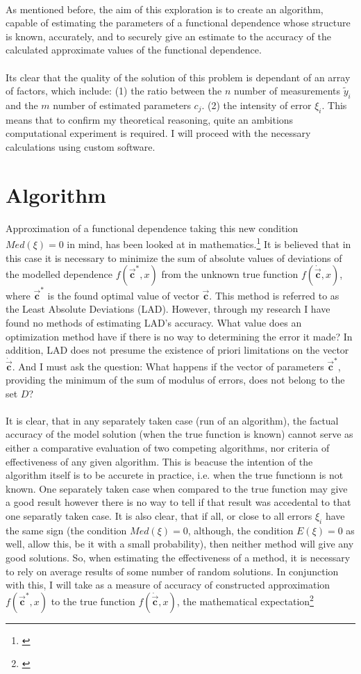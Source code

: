 \documentclass[11pt,a4paper]{article}
\numberwithin{equation}{subsection}
\newcommand{\vecc}{\vec{\textbf{c}}}
\begin{document}
\\
As mentioned before, the aim of this exploration is to create an algorithm, capable of estimating the parameters of a functional dependence whose structure is known, accurately,  and to securely give an estimate to the accuracy of the calculated approximate values of the functional dependence. \\
\\
Its clear that the quality of the solution of this problem is dependant of an array of factors, which include: (1) the ratio between the $n$ number of measurements $\tilde{y}_{i}$ and the $m$ number of estimated parameters $c_{j}$. (2) the intensity of error $\xi_{i}$. This means that to confirm my theoretical reasoning, quite an ambitions computational experiment is required. I will proceed with the necessary calculations using custom software. 

\section{Algorithm}

Approximation of a functional dependence taking this new condition $Med(\xi)=0$ in mind, has been looked at in mathematics.\footnote{\cite{balk_2010}} It is believed that in this case it is necessary to minimize the sum of absolute values of deviations of the modelled dependence $f(\vecc^{*},x)$ from the unknown true function $f(\dot{\vecc},x)$, where $\vecc^{*}$ is the found optimal value of  vector $\vecc$. This method is referred to as the Least Absolute Deviations (LAD). However, through my research I have found no methods of estimating LAD's accuracy. What value does an optimization method have if there is no way to determining the error it made? In addition, LAD does not presume the existence of priori limitations on the vector $\dot{\vecc}$. And I must ask the question: What happens if the vector of parameters $\vecc^{*}$, providing the minimum of the sum of modulus of errors, does not belong to the set $D$? \\
\\
It is clear, that in any separately taken case (run of an algorithm), the factual accuracy of the model solution (when the true function is known) cannot serve as either a comparative evaluation of two competing algorithms, nor criteria of effectiveness of any given algorithm. This is beacuse the intention of the algorithm itself is to be accurete in practice, i.e. when the true functionn is not known. One separately taken case when compared to the true function may give a good result however there is no way to tell if that result was accedental to that one separatly taken case. It is also clear, that if all, or close to all errors $\xi_{i}$ have the same sign (the condition $Med(\xi)=0$, although, the condition $E(\xi)=0$ as well, allow this, be it with a small probability), then neither method will give any good solutions. So, when estimating the effectiveness of a method, it is necessary to rely on average results of some number of random solutions. In conjunction with this, I will take as a measure of accuracy of constructed approximation $f(\vecc^{*},x)$ to the true function $f(\dot{\vecc},x)$, the mathematical expectation\footnote{\cite{Ross_2007}}
\end{document}
